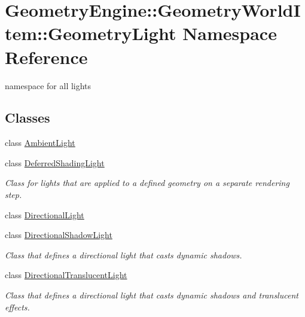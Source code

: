 \hypertarget{namespace_geometry_engine_1_1_geometry_world_item_1_1_geometry_light}{}\section{Geometry\+Engine\+::Geometry\+World\+Item\+::Geometry\+Light Namespace Reference}
\label{namespace_geometry_engine_1_1_geometry_world_item_1_1_geometry_light}


namespace for all lights  


\subsection*{Classes}
\begin{DoxyCompactItemize}
\item 
class \mbox{\hyperlink{class_geometry_engine_1_1_geometry_world_item_1_1_geometry_light_1_1_ambient_light}{Ambient\+Light}}
\item 
class \mbox{\hyperlink{class_geometry_engine_1_1_geometry_world_item_1_1_geometry_light_1_1_deferred_shading_light}{Deferred\+Shading\+Light}}
\begin{DoxyCompactList}\small\item\em Class for lights that are applied to a defined geometry on a separate rendering step. \end{DoxyCompactList}\item 
class \mbox{\hyperlink{class_geometry_engine_1_1_geometry_world_item_1_1_geometry_light_1_1_directional_light}{Directional\+Light}}
\item 
class \mbox{\hyperlink{class_geometry_engine_1_1_geometry_world_item_1_1_geometry_light_1_1_directional_shadow_light}{Directional\+Shadow\+Light}}
\begin{DoxyCompactList}\small\item\em Class that defines a directional light that casts dynamic shadows. \end{DoxyCompactList}\item 
class \mbox{\hyperlink{class_geometry_engine_1_1_geometry_world_item_1_1_geometry_light_1_1_directional_translucent_light}{Directional\+Translucent\+Light}}
\begin{DoxyCompactList}\small\item\em Class that defines a directional light that casts dynamic shadows and translucent effects. \end{DoxyCompactList}\item 

\end{DoxyCompactItemize}

